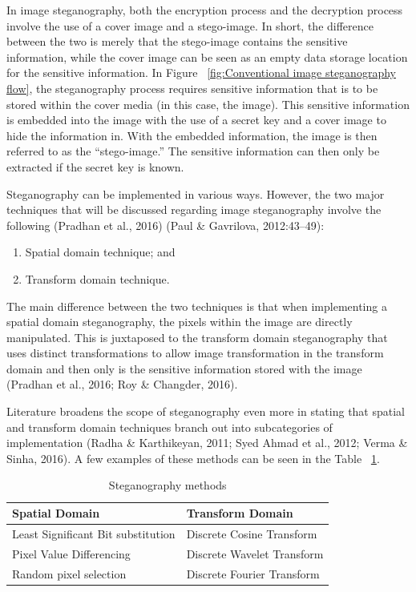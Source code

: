 In image steganography, both the encryption process and the decryption process involve the use of a cover image and a stego-image. In short, the difference between the two is merely that the stego-image contains the sensitive information, while the cover image can be seen as an empty data storage location for the sensitive information. In Figure ~\ref{fig:Conventional image steganography flow}, the steganography process requires sensitive information that is to be stored within the cover media (in this case, the image). This sensitive information is embedded into the image with the use of a secret key and a cover image to hide the information in. With the embedded information, the image is then referred to as the “stego-image.” The sensitive information can then only be extracted if the secret key is known.

Steganography can be implemented in various ways. However, the two major techniques that will be discussed regarding image steganography involve the following (Pradhan et al., 2016) (Paul \& Gavrilova, 2012:43–49):

\begin{enumerate}[label=\roman*.]
	\item Spatial domain technique; and 
	\item Transform domain technique.
\end{enumerate}

The main difference between the two techniques is that when implementing a spatial domain steganography, the pixels within the image are directly manipulated. This is juxtaposed to the transform domain steganography that uses distinct transformations to allow image transformation in the transform domain and then only is the sensitive information stored with the image (Pradhan et al., 2016; Roy \& Changder, 2016).

Literature broadens the scope of steganography even more in stating that spatial and transform domain techniques branch out into subcategories of implementation (Radha \& Karthikeyan, 2011; Syed Ahmad et al., 2012; Verma \& Sinha, 2016). A few examples of these methods can be seen in the Table ~\ref{table: Steganography methods}.

\begin{table}[h!]
\caption{Steganography methods}
\centering
 \begin{tabular}{|p{} | p{}|} 
 \hline
	\textbf{Spatial Domain} & \textbf{Transform Domain} \\ [1ex] 
 \hline\hline 
 Least Significant Bit substitution & Discrete Cosine Transform  \\[1ex]
 \hline 
 Pixel Value Differencing & Discrete Wavelet Transform  \\[1ex]
 \hline
 Random pixel selection & Discrete Fourier Transform  \\ [1ex] 
 \hline
 \end{tabular}
 \label{table: Steganography methods}
\end{table}


